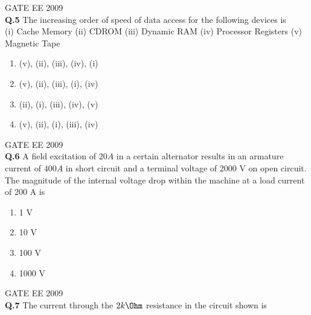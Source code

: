 \documentclass[12pt]{article}
\begin{document}
\vspace{10pt}
\hspace{10pt}
GATE EE 2009 \\
\noindent
\textbf{Q.5} The increasing order of speed of data access for the following devices is \\
(i) Cache Memory \hspace{10pt} (ii) CDROM \hspace{10pt} (iii) Dynamic RAM \hspace{10pt} (iv) Processor Registers \hspace{10pt} (v) Magnetic Tape 
\begin{enumerate}
    \item  (v), (ii), (iii), (iv), (i) \hspace{10pt}
\item  (v), (ii), (iii), (i), (iv) \hspace{10pt}
\item  (ii), (i), (iii), (iv), (v) \hspace{10pt}
\item  (v), (ii), (i), (iii), (iv)
\end{enumerate}

\vspace{10pt}
\hspace{10pt}
GATE EE 2009 \\
\noindent
\textbf{Q.6} A field excitation of $20 A$ in a certain alternator results in an armature current of $400 A$ in short circuit and a terminal voltage of 2000 V on open circuit. The magnitude of the internal voltage drop within the machine at a load current of 200 A is 
\begin{enumerate}
    \item  1 V \hspace{10pt}
\item  10 V \hspace{10pt}
\item 100 V \hspace{10pt}
\item 1000 V
\end{enumerate}
\vspace{10pt}
\hspace{10pt}
GATE EE 2009 \\
\noindent
\textbf{Q.7} The current through the $2 k\Ohm$ resistance in the circuit shown is
\end{document}
